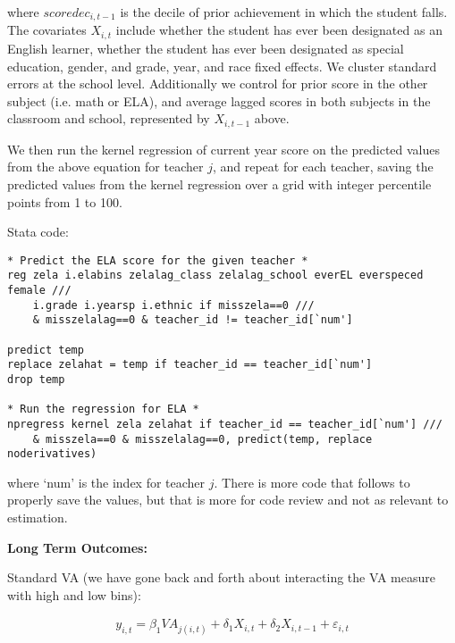\documentclass[letterpaper,12pt]{article}
\begin{document}
\noindent where $scoredec_{i, t-1}$ is the decile of prior achievement in which the student falls. The covariates $X_{i, t}$ include whether the student has ever been designated as an English learner, whether the student has ever been designated as special education, gender, and grade, year, and race fixed effects. We cluster standard errors at the school level. Additionally we control for prior score in the other subject (i.e. math or ELA), and average lagged scores in both subjects in the classroom and school, represented by $X_{i, t-1}$ above.

\noindent We then run the kernel regression of current year score on the predicted values from the above equation for teacher $j$, and repeat for each teacher, saving the predicted values from the kernel regression over a grid with integer percentile points from 1 to 100.

\vspace{.5cm}

\noindent Stata code:

\begin{verbatim}
* Predict the ELA score for the given teacher *
reg zela i.elabins zelalag_class zelalag_school everEL everspeced female ///
    i.grade i.yearsp i.ethnic if misszela==0 ///
    & misszelalag==0 & teacher_id != teacher_id[`num']
	
predict temp
replace zelahat = temp if teacher_id == teacher_id[`num']
drop temp

* Run the regression for ELA *
npregress kernel zela zelahat if teacher_id == teacher_id[`num'] ///
    & misszela==0 & misszelalag==0, predict(temp, replace noderivatives)
\end{verbatim}

\noindent where `num' is the index for teacher $j$. There is more code that follows to properly save the values, but that is more for code review and not as relevant to estimation.

\vspace{1cm}



\noindent \textbf{Long Term Outcomes:}

\noindent Standard VA (we have gone back and forth about interacting the VA measure with high and low bins):

    \begin{align*}
        y_{i, t} = \beta_1 VA_{j(i, t)} + \delta_1 X_{i, t} + \delta_2 X_{i, t-1} + \varepsilon_{i, t}
    \end{align*}
\end{document}

